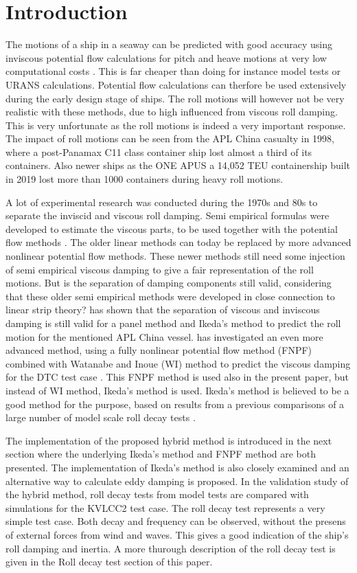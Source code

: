 \section{Introduction}\label{introduction}

The motions of a ship in a seaway can be predicted with good accuracy
using inviscous potential flow calculations for pitch and heave motions
at very low computational costs \cite{7505983/FB64RGPF}. This is far
cheaper than doing for instance model tests or URANS calculations.
Potential flow calculations can therfore be used extensively during the
early design stage of ships. The roll motions will however not be very
realistic with these methods, due to high influenced from viscous roll
damping. This is very unfortunate as the roll motions is indeed a very
important response. The impact of roll motions can be seen from the APL
China casualty in 1998, where a post-Panamax C11 class container ship
lost almost a third of its containers. Also newer ships as the ONE APUS
a 14,052 TEU containership built in 2019 lost more than 1000 containers
during heavy roll motions.

A lot of experimental research was conducted during the 1970s and 80s to
separate the inviscid and viscous roll damping. Semi empirical formulas
were developed to estimate the viscous parts, to be used together with
the potential flow methods \cite{7505983/937PN5DT}. The older linear
methods can today be replaced by more advanced nonlinear potential flow
methods. These newer methods still need some injection of semi empirical
viscous damping to give a fair representation of the roll motions. But
is the separation of damping components still valid, considering that
these older semi empirical methods were developed in close connection to
linear strip theory? \cite{7505983/UGK6YEVD} has shown that the
separation of viscous and inviscous damping is still valid for a panel
method and Ikeda's method to predict the roll motion for the mentioned
APL China vessel. \cite{7505983/24TNAV5Z} has investigated an even more
advanced method, using a fully nonlinear potential flow method (FNPF)
combined with Watanabe and Inoue (WI) method to predict the viscous
damping for the DTC test case \cite{7505983/BYNJ8CFG}. This FNPF method
is used also in the present paper, but instead of WI method, Ikeda's
method is used. Ikeda's method is believed to be a good method for the
purpose, based on results from a previous comparisons of a large number
of model scale roll decay tests \cite{7505983/QMGQ76Q9}.

The implementation of the proposed hybrid method is introduced in the
next section where the underlying Ikeda's method and FNPF method are
both presented. The implementation of Ikeda's method is also closely
examined and an alternative way to calculate eddy damping is proposed.
In the validation study of the hybrid method, roll decay tests from
model tests are compared with simulations for the KVLCC2 test case. The
roll decay test represents a very simple test case. Both decay and
frequency can be observed, without the presens of external forces from
wind and waves. This gives a good indication of the ship's roll damping
and inertia. A more thurough description of the roll decay test is given
in the Roll decay test section of this paper.

    